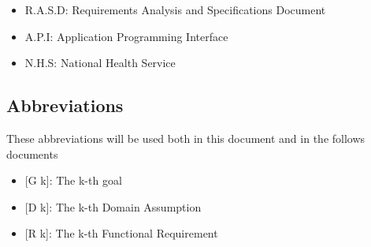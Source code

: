 \begin{itemize}
  \item R.A.S.D: Requirements Analysis and Specifications Document
  \item A.P.I: Application Programming Interface 
  \item N.H.S: National Health Service
\end{itemize}

\subsection{Abbreviations}
These abbreviations will be used both in this document and in the follows documents
\begin{itemize}
	\item {[}G k{]}: The k-th goal
    \item {[}D k{]}: The k-th Domain Assumption
    \item {[}R k{]}: The k-th Functional Requirement
\end{itemize}
